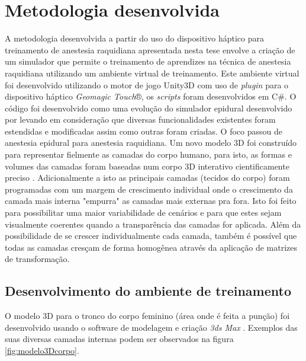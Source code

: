 \chapter{Metodologia desenvolvida} \label{cap:cap4}

A metodologia desenvolvida a partir do uso do dispositivo háptico para treinamento de anestesia raquidiana apresentada nesta tese envolve a criação de um simulador que permite o treinamento de aprendizes na técnica de anestesia raquidiana utilizando um ambiente virtual de treinamento.
Este ambiente virtual foi desenvolvido utilizando o motor de jogo Unity3D \cite{UnityTechnologies2020} com uso de \textit{plugin} para o dispositivo háptico \textit{Geomagic Touch}®, os \textit{scripts} foram desenvolvidos em C\#. O código foi desenvolvido como uma evolução do simulador epidural desenvolvido por \textcite{Brazil2017thesis} levando em consideração que diversas funcionalidades existentes foram estendidas e modificadas assim como outras foram criadas. O foco passou de anestesia epidural para anestesia raquidiana. Um novo modelo 3D foi construído para representar fielmente as camadas do corpo humano, para isto, as formas e volumes das camadas foram baseadas num corpo 3D interativo cientificamente preciso \cite{BioDigitalInc2019}. Adicionalmente a isto as principais camadas (tecidos do corpo) foram programadas com um margem de crescimento individual onde o crescimento da camada mais interna "empurra" as camadas mais externas pra fora. Isto foi feito para possibilitar uma maior variabilidade de cenários e para que estes sejam visualmente coerentes quando a transparência das camadas for aplicada. Além da possibilidade de se crescer individualmente cada camada, também é possível que todas as camadas cresçam de forma homogênea através da aplicação de matrizes de transformação. 

\section {Desenvolvimento do ambiente de treinamento} 

O modelo 3D para o tronco do corpo feminino (área onde é feita a punção) foi desenvolvido usando o software de modelagem e criação \textit{3ds Max} \cite{Autodesk}. Exemplos das suas diversas camadas internas podem ser observados na figura \ref{fig:modelo3Dcorpo}. 

